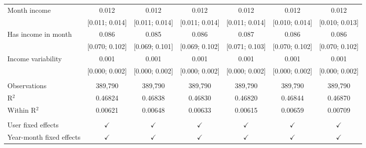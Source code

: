 \begin{tabular}{lcccccc}
   Month income               & 0.012          & 0.012          & 0.012          & 0.012            & 0.012            & 0.012\\   
                              & [0.011; 0.014] & [0.011; 0.014] & [0.011; 0.014] & [0.011; 0.014]   & [0.010; 0.014]   & [0.010; 0.013]\\   
   Has income in month        & 0.086          & 0.085          & 0.086          & 0.087            & 0.086            & 0.086\\   
                              & [0.070; 0.102] & [0.069; 0.101] & [0.069; 0.102] & [0.071; 0.103]   & [0.070; 0.102]   & [0.070; 0.102]\\   
   Income variability         & 0.001          & 0.001          & 0.001          & 0.001            & 0.001            & 0.001\\   
                              & [0.000; 0.002] & [0.000; 0.002] & [0.000; 0.002] & [0.000; 0.002]   & [0.000; 0.002]   & [0.000; 0.002]\\   
    \\
   Observations               & 389,790        & 389,790        & 389,790        & 389,790          & 389,790          & 389,790\\  
   R$^2$                      & 0.46824        & 0.46838        & 0.46830        & 0.46820          & 0.46844          & 0.46870\\  
   Within R$^2$               & 0.00621        & 0.00648        & 0.00633        & 0.00615          & 0.00659          & 0.00709\\  
    \\
   User fixed effects         & $\checkmark$   & $\checkmark$   & $\checkmark$   & $\checkmark$     & $\checkmark$     & $\checkmark$\\   
   Year-month fixed effects   & $\checkmark$   & $\checkmark$   & $\checkmark$   & $\checkmark$     & $\checkmark$     & $\checkmark$\\   
   \bottomrule
\end{tabular}
\par\endgroup


